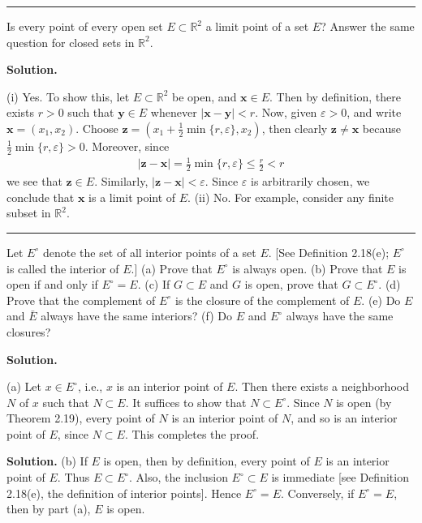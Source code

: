 \documentclass[12pt]{article}
\theoremstyle{definition}
\begin{document}
\bigskip\noindent\hrule\bigskip

Is every point of every open set $E\subset \mathbb{R}^2$ a limit point of a set $E$? Answer the same question for closed sets in $\mathbb{R}^2$.

\smallskip
\noindent\textbf{Solution.}\quad

(i) Yes. To show this, let $E\subset \mathbb{R}^2$ be open, and $\mathbf{x}\in E$. Then by definition, there exists $r>0$ such that $\mathbf{y}\in E$ whenever $\left\vert\mathbf{x}-\mathbf{y}\right\vert<r$. Now, given $\varepsilon>0$, and write $\mathbf{x}=(x_1,x_2)$. Choose $\mathbf{z}=\left(x_1+\tfrac{1}{2}\min\{r,\varepsilon\},x_2\right)$, then clearly $\mathbf{z}\ne\mathbf{x}$ because $\frac{1}{2}\min\{r,\varepsilon\}>0$. Moreover, since
\begin{align*}
\left\vert\mathbf{z}-\mathbf{x}\right\vert=\frac{1}{2}\min\{r,\varepsilon\}\le\frac{r}{2}<r
\end{align*}
we see that $\mathbf{z}\in E$. Similarly, $\left\vert\mathbf{z}-\mathbf{x}\right\vert<\varepsilon$. Since $\varepsilon$ is arbitrarily chosen, we conclude that $\mathbf{x}$ is a limit point of $E$.
(ii) No. For example, consider any finite subset in $\mathbb{R}^2$.



\bigskip\noindent\hrule\bigskip

Let $E^\circ$ denote the set of all interior points of a set $E$. [See Definition 2.18(e); $E^\circ$ is called the interior of $E$.]
(a) Prove that $E^\circ$ is always open.
(b) Prove that $E$ is open if and only if $E^\circ=E$.
(c) If $G\subset E$ and $G$ is open, prove that $G\subset E^\circ$.
(d) Prove that the complement of $E^\circ$ is the closure of the complement of $E$.
(e) Do $E$ and $\bar{E}$ always have the same interiors?
(f) Do $E$ and $E^\circ$ always have the same closures?

\smallskip
\noindent\textbf{Solution.}\quad

(a) Let $x\in E^\circ$, i.e., $x$ is an interior point of $E$. Then there exists a neighborhood $N$ of $x$ such that $N\subset E$. It suffices to show that $N\subset E^\circ$. Since $N$ is open (by Theorem 2.19), every point of $N$ is an interior point of $N$, and so is an interior point of $E$, since $N\subset E$. This completes the proof.

\smallskip
\noindent\textbf{Solution.}\quad
(b) If $E$ is open, then by definition, every point of $E$ is an interior point of $E$. Thus $E\subset E^\circ$. Also, the inclusion $E^\circ\subset E$ is immediate [see Definition 2.18(e), the definition of interior points]. Hence $E^\circ=E$. Conversely, if $E^\circ=E$, then by part (a), $E$ is open.
\end{document}
